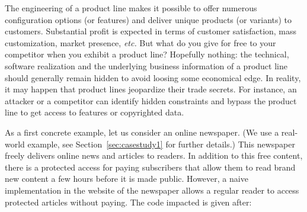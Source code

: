 \documentclass{sig-alternate}
\newcommand{\etc}{\emph{etc.}\xspace}
\begin{document}
%



The engineering of a product line makes it possible to offer numerous configuration options (or features) and deliver unique products (or variants) to customers. Substantial profit is expected in terms of customer satisfaction, mass customization, market presence, \etc 
%
 But what do you give for free to your competitor when you exhibit a product line? 
Hopefully nothing: the technical, software realization and the underlying business information of a product line should generally remain hidden to avoid loosing some economical edge.
 In reality, it may happen that product lines jeopardize their trade secrets. 
 For instance, an attacker or a competitor can identify hidden constraints and bypass the product line to get access to features or copyrighted data.

 
 
 As a first concrete example, let us consider an online newspaper. (We use a real-world example, see Section~\ref{sec:casestudy1} for further details.) This newspaper freely delivers online news and articles to readers. In addition to this free content, there is a protected access for paying subscribers that allow them to read brand new content a few hours before it is made public. However, 
 a naive implementation in the website of the newspaper allows a regular reader to access protected articles without paying. 
 The code impacted is given after: 
 
\end{document}

